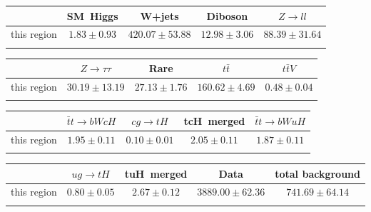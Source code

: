 \centering
\begin{tabular}{ccccc} \toprule\toprule
 & SM~Higgs & W+jets & Diboson & $Z\to ll$\\\midrule
this region & $1.83\pm0.93$ & $420.07\pm53.88$ & $12.98\pm3.06$ & $88.39\pm31.64$\\
\bottomrule\bottomrule\\
\end{tabular}
\begin{tabular}{ccccc} \toprule\toprule
 & $Z\to \tau\tau$ & Rare & $t\bar{t}$ & $t\bar{t}V$\\\midrule
this region & $30.19\pm13.19$ & $27.13\pm1.76$ & $160.62\pm4.69$ & $0.48\pm0.04$\\
\bottomrule\bottomrule\\
\end{tabular}
\begin{tabular}{ccccc} \toprule\toprule
 & $\bar{t}t\to bWcH$ & $cg\to tH$ & tcH~merged & $\bar{t}t\to bWuH$\\\midrule
this region & $1.95\pm0.11$ & $0.10\pm0.01$ & $2.05\pm0.11$ & $1.87\pm0.11$\\
\bottomrule\bottomrule\\
\end{tabular}
\begin{tabular}{ccccc} \toprule\toprule
 & $ug\to tH$ & tuH~merged & Data & total background\\\midrule
this region & $0.80\pm0.05$ & $2.67\pm0.12$ & $3889.00\pm62.36$ & $741.69\pm64.14$\\
\bottomrule\bottomrule\\
\end{tabular}
